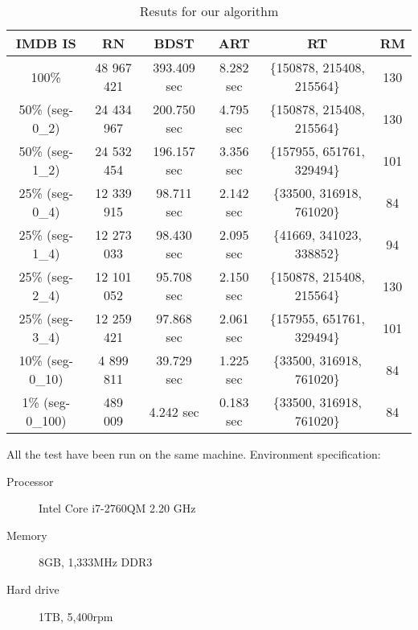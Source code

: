 \begin{table}[ht]
\caption{Resuts for our algorithm}
\centering
\begin{tabular}{c c c c c c}
\hline\hline
IMDB IS&RN&BDST&ART&RT&RM\\ [0.5ex]
\hline
100\%&48 967 421&393.409 sec&8.282 sec&\{150878, 215408, 215564\}&130\\
50\% (seg-0\_2)& 24 434 967 & 200.750 sec & 4.795 sec    & \{150878, 215408, 215564\} & 130 \\
50\% (seg-1\_2)  & 24 532 454 & 196.157 sec & 3.356 sec    & \{157955, 651761, 329494\} & 101 \\
25\% (seg-0\_4)  & 12 339 915 & 98.711 sec  & 2.142 sec    & \{33500, 316918, 761020\}  & 84  \\
25\% (seg-1\_4)  & 12 273 033 & 98.430 sec  & 2.095 sec    & \{41669, 341023, 338852\}  & 94  \\
25\% (seg-2\_4)  & 12 101 052 & 95.708 sec  & 2.150 sec    & \{150878, 215408, 215564\} & 130 \\
25\% (seg-3\_4)  & 12 259 421 & 97.868 sec  & 2.061 sec    & \{157955, 651761, 329494\} & 101 \\
10\% (seg-0\_10) & 4 899 811  & 39.729 sec  & 1.225 sec    & \{33500, 316918, 761020\}  & 84  \\
1\% (seg-0\_100) & 489 009    & 4.242 sec   & 0.183 sec    & \{33500, 316918, 761020\}  & 84  \\
\hline
\end{tabular}
\label{results}
\end{table}

All the test have been run on the same machine. Environment specification:

\begin{description}
  \item[Processor] Intel Core i7-2760QM 2.20 GHz
  \item[Memory] 8GB, 1,333MHz DDR3
  \item[Hard drive] 1TB, 5,400rpm
\end{description}
